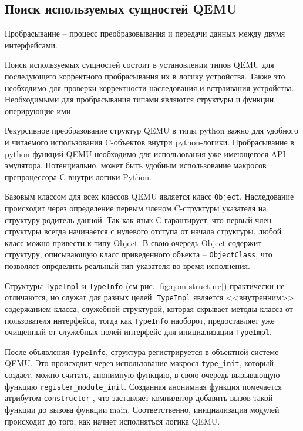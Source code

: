 \subsection{Поиск используемых сущностей QEMU}\label{sec:ch2/sec1/sub2}

Пробрасывание -- процесс преобразовывания и передачи данных между двумя интерфейсами.

Поиск используемых сущностей состоит в установлении типов QEMU для последующего
корректного пробрасывания их в логику устройства.
Также это необходимо для проверки корректности наследования и встраивания устройства.
Необходимыми для пробрасывания типами являются структуры и функции, оперирующие ими.

Рекурсивное преобразование структур QEMU в типы python важно для удобного и читаемого
использования C-объектов внутри python-логики.
Пробрасывание в python функций QEMU необходимо для использования уже имеющегося API эмулятора.
Потенциально, может быть удобным использование макросов препроцессора C внутри
логики Python.

Базовым классом для всех классов QEMU является класс \texttt{Object}.
Наследование происходит через определение первым членом C-структуры
указателя на структуру-родитель данной. Так как язык C гарантирует, что
первый член структуры всегда начинается с нулевого отступа от начала
структуры, любой класс можно привести к типу Object.
В свою очередь Object содержит структуру, описывающую класс приведенного
объекта -- \texttt{ObjectClass}, что позволяет определить реальный тип указателя
во время исполнения.

Структуры \texttt{TypeImpl} и \texttt{TypeInfo} (см рис. \ref{fig:qom-structure}) практически не отличаются,
но служат для разных целей:
\texttt{TypeImpl} является <<внутренним>> содержанием класса, служебной структурой,
которая скрывает методы класса от пользователя интерфейса, тогда как \texttt{TypeInfo}
наоборот, предоставляет уже очищенный от служебных полей интерфейс для инициализации \texttt{TypeImpl}.

После объявления \texttt{TypeInfo}, структура регистрируется в объектной системе QEMU.
Это происходит через использование макроса \texttt{type\_init}, который создает, можно считать,
анонимную функцию, в свою очередь вызывающую функцию \texttt{register\_module\_init}.
Созданная анонимная функция помечается атрибутом \texttt{constructor} \cite{gcc-attributes}, что заставляет
компилятор добавить вызов такой функции до вызова функции main.
Соответственно, инициализация модулей происходит до того, как начнет исполняться логика QEMU.

